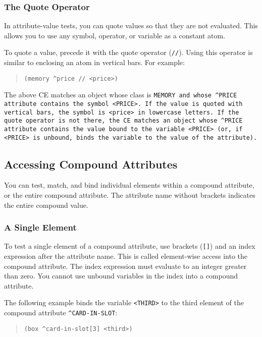 \subsubsection{The Quote Operator}

  In attribute-value tests, you can quote values so that
  they are not evaluated. This allows you to use any
  symbol, operator, or variable as a constant atom.

  To quote a value, precede it with the quote operator
  (\verb|//|). Using this operator is similar to enclosing an
  atom in vertical bars. For example:
\begin{quote}
\begin{verbatim}
(memory ^price // <price>)
\end{verbatim}
\end{quote}
The above CE matches an object whose class is \tt{MEMORY} and whose
\verb|^PRICE| attribute contains the symbol \verb|<PRICE>|. If the
value is quoted with vertical bars, the symbol is \verb|<price>| in
lowercase letters. If the quote operator is not there, the CE matches
an object whose \verb|^PRICE| attribute contains the value bound to
the variable \verb|<PRICE>| (or, if \verb|<PRICE>| is unbound, binds
the variable to the value of the attribute).

\subsection{Accessing Compound Attributes}

You can test, match, and bind individual elements within a compound
attribute, or the entire compound attribute.  The attribute name
without brackets indicates the entire compound value.

\subsubsection{A Single Element}

To test a single element of a compound attribute, use brackets
(\verb|[]|) and an index expression after the attribute name. This is
called element-wise access into the compound attribute. The index
expression must evaluate to an integer greater than zero. You cannot
use unbound variables in the index into a compound attribute.

The following example binds the variable \verb|<THIRD>| to the third
element of the compound attribute \verb|^CARD-IN-SLOT|:
\begin{quote}
\begin{verbatim}
(box ^card-in-slot[3] <third>)
\end{verbatim}
\end{quote}

